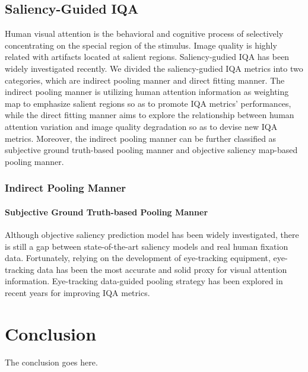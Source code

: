 \documentclass[journal]{IEEEtran}
\begin{document}
\subsection{Saliency-Guided IQA}
Human visual attention is the behavioral and cognitive process of selectively concentrating on the special region of the stimulus. Image quality is highly related with artifacts located at salient regions. Saliency-gudied IQA has been widely investigated recently. We divided the saliency-gudied IQA metrics into two categories, which are indirect pooling manner and direct fitting manner. The indirect pooling manner is utilizing human attention information as weighting map to emphasize salient regions so as to promote IQA metrics' performances, while the direct fitting manner aims to explore the relationship between human attention variation and image quality degradation so as to devise new IQA metrics.
Moreover, the indirect pooling manner can be further classified as subjective ground truth-based pooling manner and objective saliency map-based pooling manner.

\subsubsection{Indirect Pooling Manner}
\paragraph{Subjective Ground Truth-based Pooling Manner}

Although objective saliency prediction model has been widely investigated, there is still a gap between state-of-the-art saliency models and real human fixation data. Fortunately, relying on the development of eye-tracking equipment, eye-tracking data has been the most accurate and solid proxy for visual attention information. Eye-tracking data-guided pooling strategy has been explored in recent years for improving IQA metrics.





\section{Conclusion}
The conclusion goes here.








\end{document}
